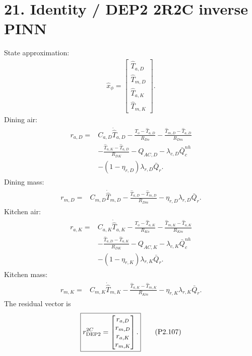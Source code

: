\documentclass[11pt]{article}
\begin{document}
\section*{21. Identity / DEP2 2R2C inverse PINN}
State approximation:
\begin{align}
\boxed{\widehat x_\phi=\begin{bmatrix}\widehat T_{a,D}\\\widehat T_{m,D}\\\widehat T_{a,K}\\\widehat T_{m,K}\end{bmatrix}.}
\tag{P2.102}
\end{align}
Dining air:
\begin{align}
\boxed{\begin{aligned}
r_{a,D}={}&C_{a,D}\dot{\widehat T}_{a,D}-\frac{T_o-\widehat T_{a,D}}{R_{Do}}-\frac{\widehat T_{m,D}-\widehat T_{a,D}}{R_{Dm}}\\
&-\frac{\widehat T_{a,K}-\widehat T_{a,D}}{R_{DK}}-Q_{AC,D}-\lambda_{c,D}\bar Q_c^{nh}\\
&-(1-\eta_{r,D})\lambda_{r,D}\bar Q_r.
\end{aligned}}
\tag{P2.103}
\end{align}
Dining mass:
\begin{align}
\boxed{\begin{aligned}
r_{m,D}={}&C_{m,D}\dot{\widehat T}_{m,D}-\frac{\widehat T_{a,D}-\widehat T_{m,D}}{R_{Dm}}-\eta_{r,D}\lambda_{r,D}\bar Q_r.
\end{aligned}}
\tag{P2.104}
\end{align}
Kitchen air:
\begin{align}
\boxed{\begin{aligned}
r_{a,K}={}&C_{a,K}\dot{\widehat T}_{a,K}-\frac{T_o-\widehat T_{a,K}}{R_{Ko}}-\frac{\widehat T_{m,K}-\widehat T_{a,K}}{R_{Km}}\\
&-\frac{\widehat T_{a,D}-\widehat T_{a,K}}{R_{DK}}-Q_{AC,K}-\lambda_{c,K}\bar Q_c^{nh}\\
&-(1-\eta_{r,K})\lambda_{r,K}\bar Q_r.
\end{aligned}}
\tag{P2.105}
\end{align}
Kitchen mass:
\begin{align}
\boxed{\begin{aligned}
r_{m,K}={}&C_{m,K}\dot{\widehat T}_{m,K}-\frac{\widehat T_{a,K}-\widehat T_{m,K}}{R_{Km}}-\eta_{r,K}\lambda_{r,K}\bar Q_r.
\end{aligned}}
\tag{P2.106}
\end{align}
The residual vector is
\begin{align}
\boxed{r_{\rm DEP2}^{2C}=\begin{bmatrix}r_{a,D}\\r_{m,D}\\r_{a,K}\\r_{m,K}\end{bmatrix}.}
\tag{P2.107}
\end{align}
\end{document}
